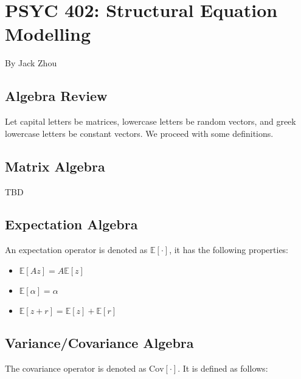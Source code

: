 \documentclass{article}
\begin{document}
\section*{PSYC 402: Structural Equation Modelling}

By Jack Zhou

\begin{multicols*}{2}




\section{Algebra Review}

Let capital letters be matrices, lowercase letters be random vectors, and greek lowercase letters be constant vectors. We proceed with some definitions.

\subsection{Matrix Algebra}

TBD

\subsection{Expectation Algebra}

An expectation operator is denoted as $\mathbb{E}[\cdot]$, it has the following properties:

\begin{itemize}
    \item $\mathbb{E}[Az] = A \mathbb{E}[z]$
    \item $\mathbb{E}[\alpha] = \alpha$
    \item $\mathbb{E}[z + r] = \mathbb{E}[z] + \mathbb{E}[r]$
\end{itemize}

\subsection{Variance/Covariance Algebra}

The covariance operator is denoted as $\textrm{Cov}[\cdot]$. It is defined as follows:


\end{multicols*}
\end{document}
